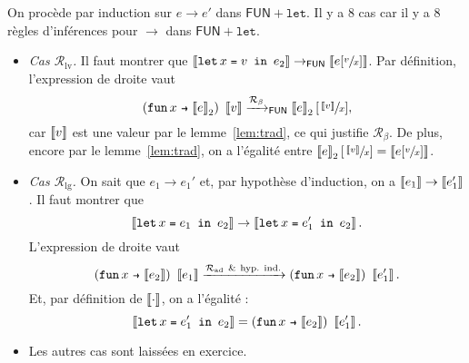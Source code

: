 \documentclass[../main]{subfiles}
\begin{document}
  \begin{prv}
    On procède par induction sur $e \to e'$ dans $\mathsf{FUN}+\mathtt{let}$.
    Il y a $8$ cas car il y a 8 règles d'inférences pour $\to$ dans $\mathsf{FUN}+\mathtt{let}$.
    \begin{itemize}
      \item \textsl{Cas $\mathcal{R}_\mathrm{lv}$.}
        Il faut montrer que $\trad{\letin x v {e_2}} \to_{\mathsf{FUN}} \trad{e[\sfrac{v}{x}]}$.
        Par définition, l'expression de droite vaut \[
          (\fun x {\trad e_2})\ \trad v \xrightarrow{\mathcal{R}_\beta}_{\mathsf{FUN}} \trad e_2 [\sfrac{\trad v}{x}]
        ,\] 
        car $\left\llbracket v\right\rrbracket$ est une valeur
        par le lemme~\ref{lem:trad}, ce qui justifie $\mathcal{R}_\beta$. De plus, encore par le lemme~\ref{lem:trad}, on a l'égalité entre $\left\llbracket e\right\rrbracket_2 [\sfrac{\left\llbracket v\right\rrbracket}{x}] = \left\llbracket e[\sfrac{v}{x}]\right\rrbracket$.
      \item \textsl{Cas $\mathcal{R}_\mathrm{lg}$.}
        On sait que $e_1 \to e_1'$ et, par hypothèse d'induction, on a $\left\llbracket e_1\right\rrbracket \to \left\llbracket e_1'\right\rrbracket$.
        Il faut montrer que \[
          \trad{\letin x {e_1} {e_2}} \to \trad{\letin x {e_1'} {e_2}}
        .\]
        L'expression de droite vaut \[
          (\fun x {\trad {e_2}})\ \trad {e_1} \xrightarrow{\mathcal{R}_\mathrm{ad}\ \&\ \text{hyp. ind.}}
          (\fun x {\trad {e_2}})\ \trad{e_1'}
        .\] 
        Et, par définition de $\left\llbracket\cdot\right\rrbracket$, on a l'égalité :
        \[
          \trad{\letin x {e_1'} {e_2}} =
          (\fun x {\trad {e_2}})\ \trad{e_1'}
        .\] 
      \item Les autres cas sont laissées en exercice.
    \end{itemize}
  \end{prv}
\end{document}
